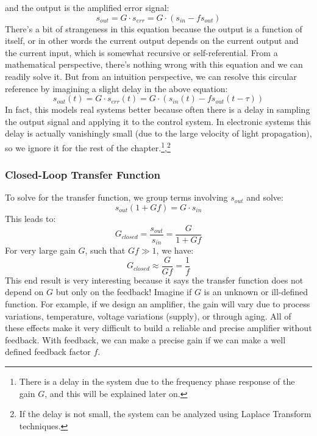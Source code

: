 and the output is the amplified error signal:
    \begin{equation}
        {s_{out}} = G \cdot {s_{err}} = G \cdot ({s_{in}} - f{s_{out}})
    \end{equation}
There's a bit of strangeness in this equation because the output is a function of itself, or in other words the current output depends on the current output and the current input, which is somewhat recursive or self-referential.  From a mathematical perspective, there's nothing wrong with this equation and we can readily solve it.  But from an intuition perspective, we can resolve this circular reference by imagining a slight delay in the above equation:
    \begin{equation}
        {s_{out}(t)} = G \cdot {s_{err}(t) } = G \cdot ({s_{in}(t)} - f{s_{out}(t-\tau)})
    \end{equation}
In fact, this models real systems better because often there is a delay in sampling the output signal and applying it to the control system.  In electronic systems this delay is actually vanishingly small (due to the large velocity of light propagation), so we ignore it for the rest of the chapter.\footnote{There is a delay in the system due to the frequency phase response of the gain $G$, and this will be explained later on.},\footnote{If the delay is not small, the system can be analyzed using Laplace Transform techniques.}  
\subsubsection{Closed-Loop Transfer Function}
To solve for the transfer function, we group terms involving $s_{out}$ and solve:
    \begin{equation}
        {s_{out}}(1 + Gf) = G \cdot {s_{in}}
    \end{equation}
This leads to:
    \begin{equation}
        {G_{closed}} = \frac{{{s_{out}}}}{{{s_{in}}}} = \frac{G}{{1 + Gf}}
    \end{equation}
For very large gain $G$, such that $Gf \gg 1$, we have:
    \begin{equation}
        {G_{closed}} \approx \frac{G}{{Gf}} = \frac{1}{f}
        \label{eq:largegain}
    \end{equation}
This end result is very interesting because it says the transfer function does not depend on $G$ but only on the feedback!  Imagine if $G$ is an unknown or ill-defined function.  For example, if we design an amplifier, the gain will vary due to process variations, temperature, voltage variations (supply), or through aging.  All of these effects make it very difficult to build a reliable and precise amplifier without feedback.  With feedback, we can make a precise gain if we can make a well defined feedback factor $f$.
